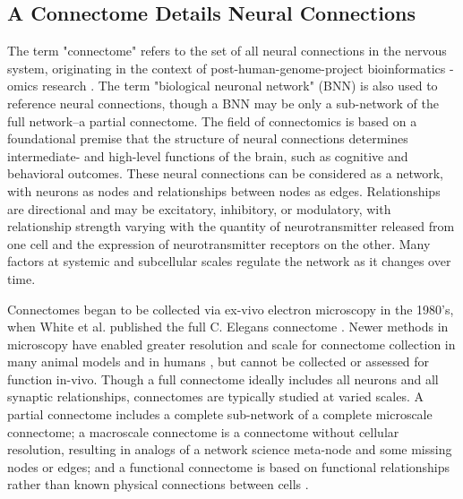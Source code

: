 \documentclass[11pt]{article}
\newcommand{\subsectionwithindent}[1]{
    \subsection*{#1}
    \hspace{\parindent} %
}
\begin{document}
\subsectionwithindent{A Connectome Details Neural Connections} %
The term "connectome" refers to the set of all neural connections in the nervous system, originating in the context of post-human-genome-project bioinformatics -omics research \cite{wikipedia2025connectome, wikipedia2025omics, green2015hgp}. The term "biological neuronal network" (BNN) \cite{wikipedia2025bnn} is also used to reference neural connections, though a BNN may be only a sub-network of the full network--a partial connectome. The field of connectomics is based on a foundational premise that the structure of neural connections determines intermediate- and high-level functions of the brain, such as cognitive and behavioral outcomes. These neural connections can be considered as a network, with neurons as nodes and relationships between nodes as edges. Relationships are directional and may be excitatory, inhibitory, or modulatory, with relationship strength varying with the quantity of neurotransmitter released from one cell and the expression of neurotransmitter receptors on the other. Many factors at systemic and subcellular scales regulate the network as it changes over time.

Connectomes began to be collected via ex-vivo electron microscopy in the 1980's, when White et al. published the full C. Elegans connectome \cite{white1986structure, emmons2015connectomics}. Newer methods in microscopy have enabled greater resolution and scale for connectome collection in many animal models and in humans \cite{sejnowski2016nanoconnectomics, amunts2013bigbrain}, but cannot be collected or assessed for function in-vivo. Though a full connectome ideally includes all neurons and all synaptic relationships, connectomes are typically studied at varied scales. A partial connectome includes a complete sub-network of a complete microscale connectome; a macroscale connectome is a connectome without cellular resolution, resulting in analogs of a network science meta-node and some missing nodes or edges; and a functional connectome is based on functional relationships rather than known physical connections between cells \cite{wikipedia2025connectome, sejnowski2016nanoconnectomics, elam2021hcp}.
\end{document}
